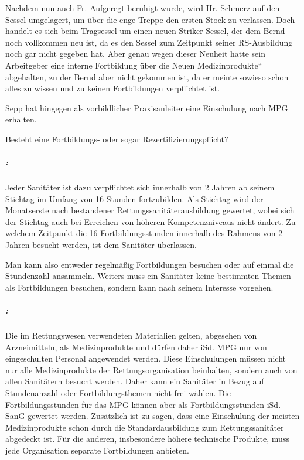 Nachdem nun auch Fr. Aufgeregt beruhigt wurde, wird Hr. Schmerz auf den
Sessel umgelagert, um \"uber die enge Treppe den ersten Stock zu
verlassen. Doch handelt es sich beim Tragsessel um einen neuen
Striker-Sessel, der dem Bernd noch vollkommen neu ist, da es den Sessel
zum Zeitpunkt seiner RS-Ausbildung noch gar nicht gegeben hat. Aber
genau wegen dieser Neuheit hatte sein Arbeitgeber eine interne
Fortbildung \"uber die {\quotedblbase}Neuen
Medizinprodukte{\textquotedblleft} abgehalten, zu der Bernd aber nicht
gekommen ist, da er meinte sowieso schon alles zu wissen und zu keinen
Fortbildungen verpflichtet ist. 

Sepp hat hingegen als vorbildlicher Praxisanleiter eine
Einschulung nach MPG erhalten.


Besteht eine Fortbildungs- oder sogar Re\-zertifizierungs\-pflicht?


\subparagraph*{  :}

Jeder Sanitäter ist dazu verpflichtet sich innerhalb von 2 Jahren ab
seinem Stichtag im Umfang von 16 Stunden fortzubilden. Als Stichtag
wird der Monatserste nach bestandener Rettungssanitäterausbildung
gewertet, wobei sich der Stichtag auch bei Erreichen von h\"oheren
Kompetenzniveaus nicht ändert. Zu welchem Zeitpunkt die 16
Fortbildungsstunden innerhalb des Rahmens von 2 Jahren besucht werden,
ist dem Sanitäter \"uberlassen.

Man kann also entweder regelmä{\ss}ig Fortbildungen besuchen oder auf
einmal die Stundenzahl ansammeln. Weiters muss ein Sanitäter keine
bestimmten Themen als Fortbildungen besuchen, sondern kann nach seinem
Interesse vorgehen.

\subparagraph*{ 
:}

Die im Rettungswesen verwendeten Materialien gelten, abgesehen von
Arzneimitteln, als Medizinprodukte und d\"urfen daher iSd. MPG nur von
eingeschulten Personal angewendet werden. Diese Einschulungen m\"ussen
nicht nur alle Medizinprodukte der Rettungsorganisation beinhalten,
sondern auch von allen Sanitätern besucht werden. Daher kann ein
Sanitäter in Bezug auf Stundenanzahl oder Fortbildungsthemen nicht
frei wählen. Die Fortbildungsstunden f\"ur das MPG k\"onnen aber als
Fortbildungsstunden iSd. SanG gewertet werden. Zusätzlich ist zu
sagen, dass eine Einschulung der meisten Medizinprodukte schon durch
die Standardausbildung zum Rettungs\-sani\-täter abgedeckt ist. F\"ur
die anderen, insbesondere h\"ohere technische Produkte, muss jede
Org\-anisation separate Fortbildungen anbieten.


